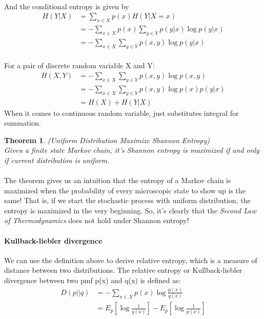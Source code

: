 \documentclass[a4paper, 11pt]{article} %
\newtheorem*{theorem*}{Theorem}
\begin{document}
\paragraph{}
And the conditional entropy is given by
\begin{align*} 
 H(Y|X)	&= \sum_{x\in X}p(x)H(Y|X=x)\\
 &=-\sum_{x\in X}p(x)\sum_{y\in Y}p(y|x)\log p(y|x)\\
 &=-\sum_{x\in X}\sum_{y\in Y}p(x,y)\log p(y|x)
 \end{align*}

\paragraph{}
For a pair of discrete random variable X and Y:
\begin{align*} 
 H(X,Y)	&= -\sum_{x\in X}\sum_{y\in Y}p(x,y)\log p(x,y)\\
        &= -\sum_{x\in X}\sum_{y\in Y}p(x,y)\log p(x)p(y|x)\\
        &=H(X)+H(Y|X)
\end{align*}
When it comes to continuous random variable, just substitutes integral for summation. 
\begin{theorem*}
\emph{(Uniform Distribution Maximize Shannon Entropy)}\\
Given a finite state Markov chain, it's Shannon entropy is maximized if and only if current distribution is uniform.
\end{theorem*}
\paragraph{}
The theorem gives us an intuition that the entropy of a Markov chain is maximized when the probability of every microscopic state to show up  is the same! That is, if we start the stochastic process with uniform distribution, the entropy is maximized in the very beginning. So, it's clearly that the {\it Second Law of Thermodynamics} does not hold under Shannon entropy!

\paragraph{Kullback-liebler divergence}
We can use the definition above to derive relative entropy, which is a measure of distance between two distributions. The relative entropy or Kullback-liebler divergence between two pmf p(x) and q(x) is defined as:
\begin{align*} 
 D(p||q) &= -\sum_{x\in X}p(x)\log \frac{p(x)}{q(x)}\\
         &=E_p[\log \frac{1}{q(x)}]-E_p[\log \frac{1}{p(x)}]
 \end{align*}
\end{document}
